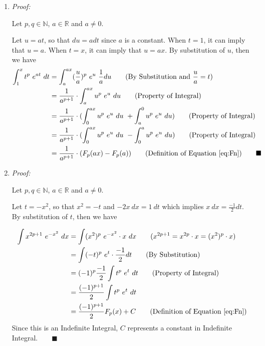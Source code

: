 \documentclass[12pt]{exam}
\newcommand{\vv}{\vspace{.1cm}}
\newcommand{\R}{\mathbb{R}}
\newcommand{\N}{\mathbb{N}}
\begin{document}
\begin{enumerate}
\vv

\begin{enumerate}
    \item \emph{Proof:}
		
		Let $p, q\in\N$, $a\in\R$ and $a \neq 0$.
		
		Let $u=at$, so that $du=adt$ since $a$ is a constant. When $t=1$, it can imply that $u=a$. When $t=x$, it can imply that $u=ax$. By substitution of $u$, then we have
		\begin{align*}
		    \int_1^x t^p\ e^{at}\ dt&=\int_a^{ax} (\frac{u}{a})^p\ e^{u}\ \frac{1}{a}du\qquad(\mbox{By Substitution and }\frac{u}{a}=t)\\
		    &=\frac{1}{a^{p+1}}\cdot\int_a^{ax} u^p\ e^{u}\ du\qquad(\mbox{Property of Integral})\\
		    &=\frac{1}{a^{p+1}}\cdot(\int_0^{ax} u^p\ e^{u}\ du\ +\int_a^{0} u^p\ e^{u}\ du)\qquad(\mbox{Property of Integral})\\
		    &=\frac{1}{a^{p+1}}\cdot(\int_0^{ax} u^p\ e^{u}\ du\ -\int_0^{a} u^p\ e^{u}\ du)\qquad(\mbox{Property of Integral})\\
		    &=\frac{1}{a^{p+1}}\cdot(F_p(ax) - F_p(a))\qquad(\mbox{Definition of Equation \eqref{eq:Fn}})\qquad\blacksquare
		\end{align*}
		
		\newpage
    \item \emph{Proof:}
    
        Let $p, q\in\N$, $a\in\R$ and $a \neq 0$.
        
        Let $t=-x^2$, so that $x^2=-t$ and $-2x\ dx=1\ dt$ which implies $x\ dx=\frac{-1}{2}dt$. By substitution of $t$, then we have
        
        \begin{align*}
            \int x^{2p+1} \ e^{-x^2} \ dx &= \int (x^2)^p \ e^{-x^2}\cdot x\ dx\qquad(x^{2p+1}=x^{2p}\cdot x=(x^2)^p\cdot x)\\
            &=\int (-t)^p \ e^t\cdot \frac{-1}{2}dt\qquad(\mbox{By Substitution})\\
            &=(-1)^p\frac{-1}{2}\int t^p \ e^t\ dt\qquad(\mbox{Property of Integral})\\
            &=\frac{(-1)^{p+1}}{2}\int t^p \ e^t\ dt\\
            &=\frac{(-1)^{p+1}}{2}F_p(x)+C\qquad(\mbox{Definition of Equation \eqref{eq:Fn}})
        \end{align*}
        Since this is an Indefinite Integral, $C$ represents a constant in Indefinite Integral.$\qquad\blacksquare$
        

\end{enumerate}
\end{enumerate}
\end{document}
